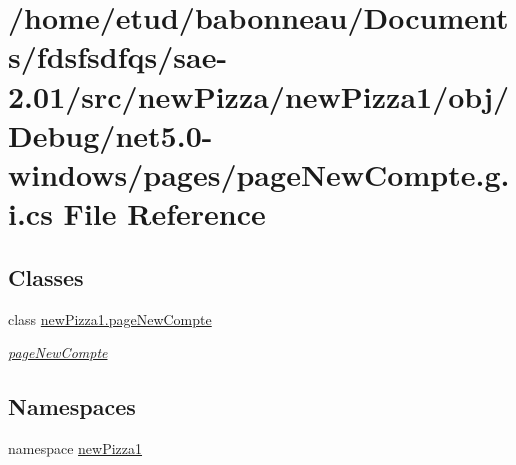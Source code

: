 \hypertarget{net5_80-windows_2pages_2pageNewCompte_8g_8i_8cs}{}\section{/home/etud/babonneau/\+Documents/fdsfsdfqs/sae-\/2.01/src/new\+Pizza/new\+Pizza1/obj/\+Debug/net5.0-\/windows/pages/page\+New\+Compte.g.\+i.\+cs File Reference}
\label{net5_80-windows_2pages_2pageNewCompte_8g_8i_8cs}
\subsection*{Classes}
\begin{DoxyCompactItemize}
\item 
class \hyperlink{classnewPizza1_1_1pageNewCompte}{new\+Pizza1.\+page\+New\+Compte}
\begin{DoxyCompactList}\small\item\em \hyperlink{classnewPizza1_1_1pageNewCompte}{page\+New\+Compte} \end{DoxyCompactList}\end{DoxyCompactItemize}
\subsection*{Namespaces}
\begin{DoxyCompactItemize}
\item 
namespace \hyperlink{namespacenewPizza1}{new\+Pizza1}
\end{DoxyCompactItemize}
